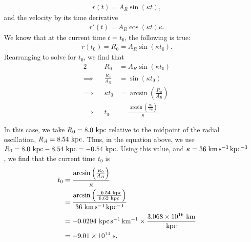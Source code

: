 \documentclass[11pt,letterpaper]{article}
\begin{document}
\begin{enumerate}[label=(\alph*)]
\begin{align*}
            r(t) = A_R\sin{(\kappa t)},
        \end{align*}
        and the velocity by its time derivative 
        \begin{align*}
            r'(t) = A_R\cos{(\kappa t)}\kappa.
        \end{align*}
        We know that at the current time $t=t_0$, the following is true:
        \begin{align*}
            r(t_0) = R_0 = A_R\sin{(\kappa t_0)}.
        \end{align*}
        Rearranging to solve for $t_0$, we find that 
        \begin{alignat*}{2}
            &&R_0 &= A_R\sin{(\kappa t_0)} \\
            \implies&&\frac{R_0}{A_R} &= \sin{(\kappa t_0)} \\
            \implies&&\kappa t_0 &= \arcsin{\left(\frac{R_0}{A_R}\right)} \\
            \implies&&t_0 &= \frac{\arcsin{\left(\frac{R_0}{A_R}\right)}}{\kappa}.
        \end{alignat*}

        
        In this case, we take $R_0 = 8.0~{\rm kpc}$ relative to the midpoint of the radial oscillation, $R_A = 8.54~{\rm kpc}$. Thus, in the equation above, we use $R_0 = 8.0~{\rm kpc} - 8.54~{\rm kpc} = -0.54~{\rm kpc}$. Using this value, and $\kappa = 36~{\rm km\,s^{-1}\,kpc^{-1}}$, we find that the current time $t_0$ is
        \begin{align*}
            t_0 &= \frac{\arcsin{\left(\frac{R_0}{A_R}\right)}}{\kappa} \\
            &= \frac{\arcsin{\left(\frac{-0.54~{\rm kpc}}{0.62~{\rm kpc}}\right)}}{36~{\rm km\,s^{-1}\,kpc^{-1}}} \\
            &= -0.0294~{\rm kpc\,s^{-1}\,km^{-1}} \times \frac{3.068\times 10^{16}~{\rm km}}{{\rm kpc}} \\
            &= -9.01\times 10^{14}~{\rm s}.
        \end{align*}


\end{enumerate}
\end{document}
